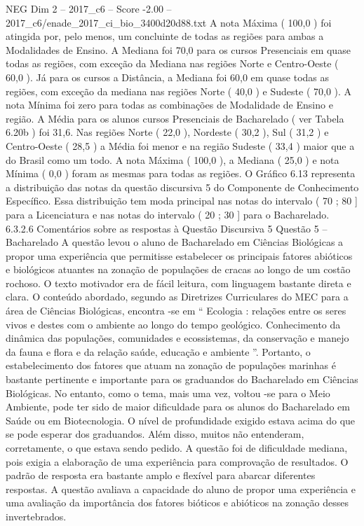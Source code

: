 \begin{textsample}{NEG Dim 2 – 2017\_c6 – Score -2.00 – 2017\_c6/enade\_2017\_ci\_bio\_3400d20d88.txt}
A nota Máxima ( 100,0 ) foi atingida por, pelo menos, um concluinte de todas as regiões para ambas a Modalidades de Ensino.
A Mediana foi 70,0 para os cursos Presenciais em quase todas as regiões, com exceção da Mediana nas regiões Norte e Centro-Oeste ( 60,0 ).
Já para os cursos a Distância, a Mediana foi 60,0 em quase todas as regiões, com exceção da mediana nas regiões Norte ( 40,0 ) e Sudeste ( 70,0 ).
A nota Mínima foi zero para todas as combinações de Modalidade de Ensino e região.
A Média para os alunos cursos Presenciais de Bacharelado ( ver Tabela 6.20b ) foi 31,6.
Nas regiões Norte ( 22,0 ), Nordeste ( 30,2 ), Sul ( 31,2 ) e Centro-Oeste ( 28,5 ) a Média foi menor e na região Sudeste ( 33,4 ) maior que a do Brasil como um todo.
A nota Máxima ( 100,0 ), a Mediana ( 25,0 ) e nota Mínima ( 0,0 ) foram as mesmas para todas as regiões.
O Gráfico 6.13 representa a distribuição das notas da questão discursiva 5 do Componente de Conhecimento Específico.
Essa distribuição tem moda principal nas notas do intervalo ( 70 ; 80 ] para a Licenciatura e nas notas do intervalo ( 20 ; 30 ] para o Bacharelado. 6.3.2.6 Comentários sobre as respostas à Questão Discursiva 5 Questão 5 – Bacharelado A questão levou o aluno de Bacharelado em Ciências Biológicas a propor uma experiência que permitisse estabelecer os principais fatores abióticos e biológicos atuantes na zonação de populações de cracas ao longo de um costão rochoso.
O texto motivador era de fácil leitura, com linguagem bastante direta e clara.
O conteúdo abordado, segundo as Diretrizes Curriculares do MEC para a área de Ciências Biológicas, encontra -se em “ Ecologia : relações entre os seres vivos e destes com o ambiente ao longo do tempo geológico.
Conhecimento da dinâmica das populações, comunidades e ecossistemas, da conservação e manejo da fauna e flora e da relação saúde, educação e ambiente ”.
Portanto, o estabelecimento dos fatores que atuam na zonação de populações marinhas é bastante pertinente e importante para os graduandos do Bacharelado em Ciências Biológicas.
No entanto, como o tema, mais uma vez, voltou -se para o Meio Ambiente, pode ter sido de maior dificuldade para os alunos do Bacharelado em Saúde ou em Biotecnologia.
O nível de profundidade exigido estava acima do que se pode esperar dos graduandos.
Além disso, muitos não entenderam, corretamente, o que estava sendo pedido.
A questão foi de dificuldade mediana, pois exigia a elaboração de uma experiência para comprovação de resultados.
O padrão de resposta era bastante amplo e flexível para abarcar diferentes respostas.
A questão avaliava a capacidade do aluno de propor uma experiência e uma avaliação da importância dos fatores bióticos e abióticos na zonação desses invertebrados.

\end{textsample}
